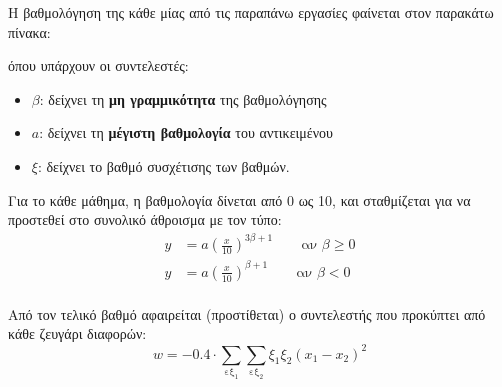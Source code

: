 \documentclass[11pt,a4paper,notitlepage,fleqn]{article}
\begin{document}
Η βαθμολόγηση της κάθε μίας από τις παραπάνω εργασίες φαίνεται στον παρακάτω πίνακα:
\begin{table}[H]
	\centering
\end{table}

όπου υπάρχουν οι συντελεστές:
\begin{itemize}
	\item \( β \): δείχνει τη \textbf{μη γραμμικότητα} της βαθμολόγησης
	\item \( a \): δείχνει τη \textbf{μέγιστη βαθμολογία} του αντικειμένου
	\item \( ξ \): δείχνει το βαθμό συσχέτισης των βαθμών.
\end{itemize}

Για το κάθε μάθημα, η βαθμολογία δίνεται από 0 ως 10, και σταθμίζεται για να προστεθεί στο συνολικό άθροισμα με τον τύπο:
\begin{align*}
y &= a \left(\frac{x}{10}\right)^{3β+1} \qquad \text{αν } β \geq 0 \\
y &= a \left(\frac{x}{10}\right)^{β+1} \qquad \text{αν } β < 0 \\
\end{align*}

Από τον τελικό βαθμό αφαιρείται (προστίθεται) ο συντελεστής που προκύπτει από κάθε ζευγάρι διαφορών:
\[
w = - 0.4 \cdot \sum_{\text{εξ}_1}\sum_{\text{εξ}_2} ξ_1 ξ_2 (x_1-x_2)^2
\]
\end{document}
